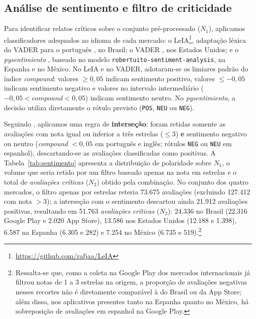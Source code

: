 \subsection{Análise de sentimento e filtro de criticidade}

Para identificar relatos críticos sobre o conjunto pré-processado ($N_1$), aplicamos classificadores adequados ao idioma de cada mercado: o LeIA\footnote{\url{https://github.com/rafjaa/LeIA}}, adaptação léxica do VADER para o português \parencite{pereira2021}, no Brasil; o VADER \parencite{hutto2014}, nos Estados Unidos; e o \textit{pysentimiento} \parencite{perez2021}, baseado no modelo \texttt{robertuito-sentiment-analysis}, na Espanha e no México. No LeIA e no VADER, adotaram-se os limiares padrão do índice \textit{compound}: valores $\ge 0{,}05$ indicam sentimento positivo, valores $\le -0{,}05$ indicam sentimento negativo e valores no intervalo intermediário ($-0{,}05 < \textit{compound} < 0{,}05$) indicam sentimento neutro. No \textit{pysentimiento}, a decisão utiliza diretamente o rótulo previsto (\texttt{POS}, \texttt{NEU} ou \texttt{NEG}).

Seguindo \textcite{alsebayel2025}, aplicamos uma regra de \textbf{interseção}: foram retidas somente as avaliações com nota igual ou inferior a três estrelas ($\le 3$) \textbf{e} sentimento negativo ou neutro (\textit{compound} $< 0{,}05$ em português e inglês; rótulos \texttt{NEG} ou \texttt{NEU} em espanhol), descartando-se as avaliações classificadas como positivas. A Tabela~\ref{tab:sentimento} apresenta a distribuição de polaridade sobre $N_1$, o volume que seria retido por um filtro baseado apenas na nota em estrelas e o total de \textit{avaliações críticas} ($N_2$) obtido pela combinação. No conjunto dos quatro mercados, o filtro apenas por estrelas reteria 73.675 avaliações (excluindo 127.412 com nota $> 3$); a interseção com o sentimento descartou ainda 21.912 avaliações positivas, resultando em 51.763 \textit{avaliações críticas} ($N_2$): 24.336 no Brasil (22.316 Google Play e 2.020 App Store), 13.586 nos Estados Unidos (12.188 e 1.398), 6.587 na Espanha (6.305 e 282) e 7.254 no México (6.735 e 519).\footnote{Ressalta-se que, como a coleta na Google Play dos mercados internacionais já filtrou notas de 1 a 3 estrelas na origem, a proporção de avaliações negativas nesses recortes não é diretamente comparável à do Brasil ou da App Store; além disso, nos aplicativos presentes tanto na Espanha quanto no México, há sobreposição de avaliações em espanhol na Google Play.}

